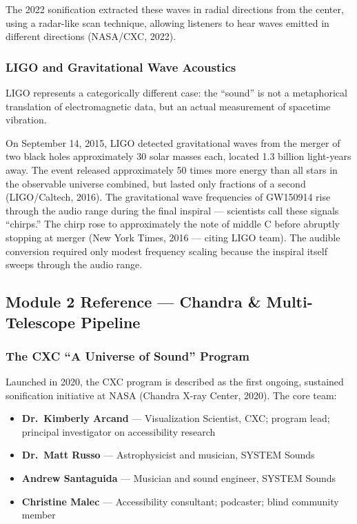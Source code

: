 \documentclass[11pt,letterpaper]{article}
\begin{document}
The 2022 sonification extracted these waves in radial directions from the center, using a radar-like scan technique, allowing listeners to hear waves emitted in different directions (NASA/CXC, 2022).

\subsubsection{LIGO and Gravitational Wave Acoustics}

LIGO represents a categorically different case: the ``sound'' is not a metaphorical translation of electromagnetic data, but an actual measurement of spacetime vibration.

On September 14, 2015, LIGO detected gravitational waves from the merger of two black holes approximately 30 solar masses each, located 1.3 billion light-years away. The event released approximately 50 times more energy than all stars in the observable universe combined, but lasted only fractions of a second (LIGO/Caltech, 2016). The gravitational wave frequencies of GW150914 rise through the audio range during the final inspiral — scientists call these signals ``chirps.'' The chirp rose to approximately the note of middle C before abruptly stopping at merger (New York Times, 2016 — citing LIGO team). The audible conversion required only modest frequency scaling because the inspiral itself sweeps through the audio range.

\subsection{Module 2 Reference — Chandra \& Multi-Telescope Pipeline}

\subsubsection{The CXC ``A Universe of Sound'' Program}

Launched in 2020, the CXC program is described as the first ongoing, sustained sonification initiative at NASA (Chandra X-ray Center, 2020). The core team:

\begin{itemize}
  \item \textbf{Dr.\ Kimberly Arcand} — Visualization Scientist, CXC; program lead; principal investigator on accessibility research
  \item \textbf{Dr.\ Matt Russo} — Astrophysicist and musician, SYSTEM Sounds
  \item \textbf{Andrew Santaguida} — Musician and sound engineer, SYSTEM Sounds
  \item \textbf{Christine Malec} — Accessibility consultant; podcaster; blind community member
\end{itemize}
\end{document}
